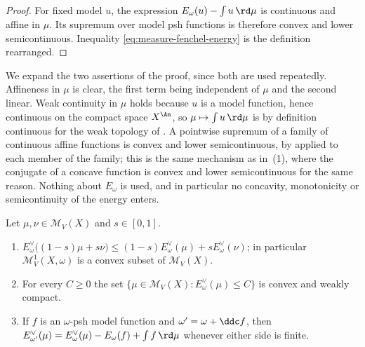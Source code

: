 \begin{proof}
For fixed model $u$, the expression
$E_\omega(u)-\int u\,\rd \mu$ is continuous and affine in $\mu$.
Its supremum over model psh functions is therefore convex and lower
semicontinuous.  Inequality \eqref{eq:measure-fenchel-energy} is the
definition rearranged.
\end{proof}

We expand the two assertions of the proof, since both are used repeatedly.
Affineness in $\mu$ is clear, the first term being independent of $\mu$
and the second linear.  Weak continuity in $\mu$ holds because $u$ is a
model function, hence continuous on the compact space $X^{\An}$, so
$\mu\mapsto\int u\,\rd\mu$ is by definition continuous for the weak
topology of .  A pointwise supremum of a family of
continuous affine functions is convex and lower semicontinuous, by
 applied to each member of the family; this is
the same mechanism as in \,(1), where the
conjugate of a concave function is convex and lower semicontinuous for the
same reason.  Nothing about $E_\omega$ is used, and in particular no
concavity, monotonicity or semicontinuity of the energy enters.

\begin{proposition}
\label{prop:ch28-dual-order}
Let $\mu,\nu\in\mathcal M_V(X)$ and $s\in[0,1]$.
\begin{enumerate}
\item\label{itm:ch28-dual:convex}
 $E^\vee_\omega\bigl((1-s)\mu+s\nu\bigr)\leq
 (1-s)E^\vee_\omega(\mu)+sE^\vee_\omega(\nu)$; in particular
 $\mathcal M^1_V(X,\omega)$ is a convex subset of $\mathcal M_V(X)$.
\item\label{itm:ch28-dual:sublevel}
 For every $C\geq0$ the set
 $\{\mu\in\mathcal M_V(X):E^\vee_\omega(\mu)\leq C\}$ is convex and weakly
 compact.
\item\label{itm:ch28-dual:reference}
 If $f$ is an $\omega$-psh model function and $\omega'=\omega+\ddc f$,
 then $E^{\vee}_{\omega'}(\mu)=E^\vee_\omega(\mu)-E_\omega(f)
 +\int f\,\rd\mu$ whenever either side is finite.
\end{enumerate}
\end{proposition}

